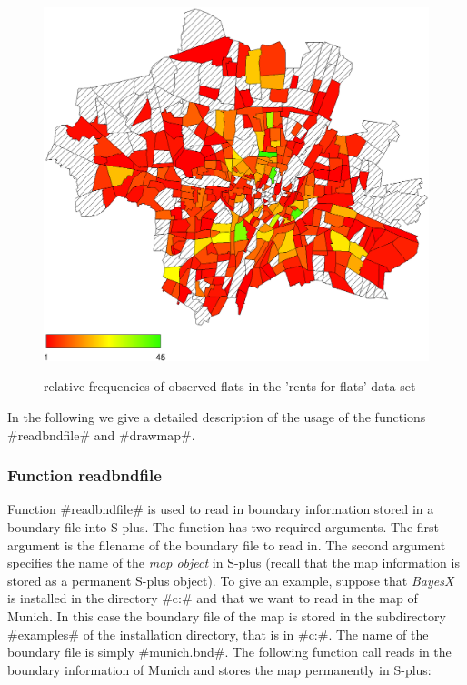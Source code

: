 \begin{figure}[ht]
\begin{center}
\includegraphics[scale=0.5]{grafiken/munichfr.eps}
{\em\caption{ \label{munichrelfreq} relative frequencies of
observed flats in the 'rents for flats' data set}}
\end{center}
\end{figure}


In the following we give a detailed description of the usage of
the functions #readbndfile# and #drawmap#.

\subsubsection*{Function readbndfile}
 

Function #readbndfile# is used to read in boundary information
stored in a boundary file into S-plus. The function has two
required arguments. The first argument is the filename of the
boundary file to read in. The second argument specifies the name
of the {\em map object} in S-plus (recall that the map information
is stored as a permanent S-plus object). To give an example,
suppose that {\em BayesX} is installed in the directory #c:\bayes#
and that we want to read in the map of Munich. In this case the
boundary file of the map is stored in the subdirectory #examples#
of the installation directory, that is in #c:\bayes\examples#. The
name of the boundary file is simply #munich.bnd#. The following
function call reads in the boundary information of Munich and
stores the map permanently in S-plus:

